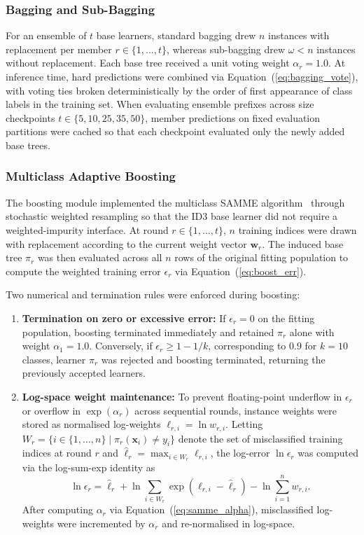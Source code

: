 \subsubsection{Bagging and Sub-Bagging}
For an ensemble of $t$ base learners, standard bagging drew $n$ instances with replacement per member $r \in \{1, \dots, t\}$, whereas sub-bagging drew $\omega < n$ instances without replacement. Each base tree received a unit voting weight $\alpha_r = 1.0$. At inference time, hard predictions were combined via Equation~(\ref{eq:bagging_vote}), with voting ties broken deterministically by the order of first appearance of class labels in the training set. When evaluating ensemble prefixes across size checkpoints $t \in \{5, 10, 25, 35, 50\}$, member predictions on fixed evaluation partitions were cached so that each checkpoint evaluated only the newly added base trees.

\subsubsection{Multiclass Adaptive Boosting}
The boosting module implemented the multiclass SAMME algorithm~\cite{Zhu2009} through stochastic weighted resampling so that the ID3 base learner did not require a weighted-impurity interface. At round $r \in \{1, \dots, t\}$, $n$ training indices were drawn with replacement according to the current weight vector $\mathbf{w}_r$. The induced base tree $\pi_r$ was then evaluated across all $n$ rows of the original fitting population to compute the weighted training error $\epsilon_r$ via Equation~(\ref{eq:boost_err}).

Two numerical and termination rules were enforced during boosting:
\begin{enumerate}
    \item \textbf{Termination on zero or excessive error:} If $\epsilon_r = 0$ on the fitting population, boosting terminated immediately and retained $\pi_r$ alone with weight $\alpha_1 = 1.0$. Conversely, if $\epsilon_r \ge 1 - 1/k$, corresponding to $0.9$ for $k = 10$ classes, learner $\pi_r$ was rejected and boosting terminated, returning the previously accepted learners.
    \item \textbf{Log-space weight maintenance:} To prevent floating-point underflow in $\epsilon_r$ or overflow in $\exp(\alpha_r)$ across sequential rounds, instance weights were stored as normalised log-weights $\ell_{r,i} = \ln w_{r,i}$. Letting $W_r = \{i \in \{1, \dots, n\} \mid \pi_r(\mathbf{x}_i) \ne y_i\}$ denote the set of misclassified training indices at round $r$ and $\hat{\ell}_r = \max_{i \in W_r} \ell_{r,i}$, the log-error $\ln \epsilon_r$ was computed via the log-sum-exp identity as
    \begin{equation}
        \ln \epsilon_r = \hat{\ell}_r + \ln \sum_{i \in W_r} \exp(\ell_{r,i} - \hat{\ell}_r) - \ln \sum_{i=1}^n w_{r,i}.
        \label{eq:log_err}
    \end{equation}
    After computing $\alpha_r$ via Equation~(\ref{eq:samme_alpha}), misclassified log-weights were incremented by $\alpha_r$ and re-normalised in log-space.
\end{enumerate}


